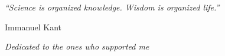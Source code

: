 \documentclass[a4paper, 11pt, twoside]{book}  %
\numberwithin{equation}{section}
\begin{document}
\dominitoc
\frontmatter      %
\pagestyle{empty}  %
%

\cleardoublepage
\null\vfill
\begin{minipage}{5in}
  \textit{``Science is organized knowledge. Wisdom is organized life.''}
\end{minipage}
\begin{flushright}
Immanuel Kant
\end{flushright}
\vfill\vfill\null
\cleardoublepage  %
%

\cleardoublepage

\pagestyle{fancy}
\fancyhead{}  %
\fancyhead[RE, LO]{\thepage}
\fancyhead[RO]{\rightmark}
\fancyhead[LE]{\leftmark}
\cfoot{}

\adjustmtc
\setcounter{tocdepth}{1}
\tableofcontents  %
\listoffigures  {} \mtcaddchapter%
\listoftables  {}  \mtcaddchapter   %

\cleardoublepage
\pagestyle{empty}
\null\vfil
\begin{center}{\Large \sl Dedicated to the ones who supported me}\end{center}
\vfil\null
\cleardoublepage
{}  %

\mainmatter	  %
\pagestyle{fancy}
\adjustmtc

%

\backmatter
\label{Bibliography}
\renewcommand\bibname{References}

\end{document}
